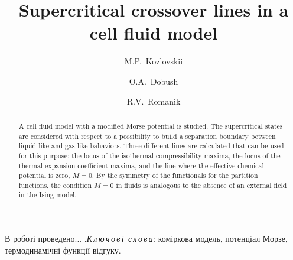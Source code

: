 \documentclass[fleqn,twoside,twocolumn,nofootinbib,showkeys]{revtex4} %
\begin{document}
	\title[Supercritical crossover lines in a cell fluid model]%
	{Supercritical crossover lines in a cell fluid model}%
	\author{M.P.~Kozlovskii}%
	\author{O.A.~Dobush}
	\author{R.V.~Romanik}
	\address{1, Svientsitskii Str., Lviv 79011, Ukraine}%
	
	 \razd{\secv}
	
	
	\setcounter{page}{1}%
	
	\begin{abstract}
		A cell fluid model with a modified Morse potential is studied. The supercritical states are considered with respect to a possibility to build a separation boundary between liquid-like and gas-like bahaviors. Three different lines are calculated that can be used for this purpose: the locus of the isothermal compressibility maxima, the locus of the thermal expansion coefficient maxima, and the line where the effective chemical potential is zero, $M=0$. By the symmetry of the functionals for the partition functions, the condition $M=0$ in fluids is analogous to the absence of an external field in the Ising model.
	\end{abstract}
	
	
	\maketitle
	
	
	
	
		
	\vspace*{-5mm} {В роботі проведено... .}{\textit{К\,л\,ю\,ч\,о\,в\,і\,
			с\,л\,о\,в\,а:} коміркова модель, потенціал Морзе, термодинамічні функції відгуку.}
	
\end{document}
